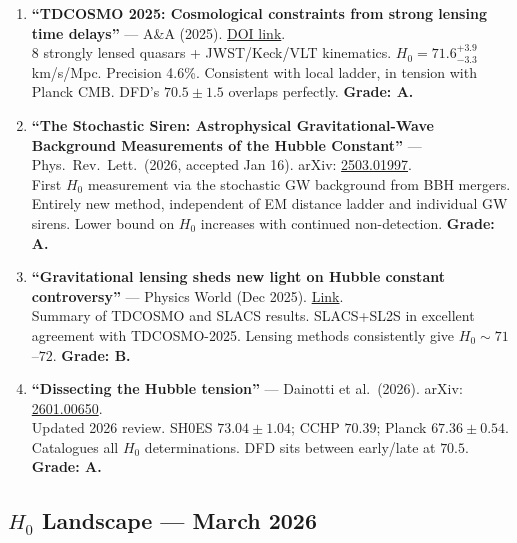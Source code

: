 \documentclass[11pt,a4paper]{article}
\begin{document}
\begin{enumerate}
\item \textbf{``TDCOSMO 2025: Cosmological constraints from strong lensing time delays''} --- A\&A (2025). \href{https://www.aanda.org/articles/aa/full_html/2025/12/aa55801-25/aa55801-25.html}{DOI link}.\\
8 strongly lensed quasars + JWST/Keck/VLT kinematics. $H_0 = 71.6^{+3.9}_{-3.3}$ km/s/Mpc. Precision 4.6\%. Consistent with local ladder, in tension with Planck CMB. DFD's $70.5 \pm 1.5$ overlaps perfectly. \textbf{Grade: A.}

\item \textbf{``The Stochastic Siren: Astrophysical Gravitational-Wave Background Measurements of the Hubble Constant''} --- Phys.\ Rev.\ Lett.\ (2026, accepted Jan 16). arXiv: \href{https://arxiv.org/abs/2503.01997}{2503.01997}.\\
First $H_0$ measurement via the stochastic GW background from BBH mergers. Entirely new method, independent of EM distance ladder and individual GW sirens. Lower bound on $H_0$ increases with continued non-detection. \textbf{Grade: A.}

\item \textbf{``Gravitational lensing sheds new light on Hubble constant controversy''} --- Physics World (Dec 2025). \href{https://physicsworld.com/a/gravitational-lensing-sheds-new-light-on-hubble-constant-controversy/}{Link}.\\
Summary of TDCOSMO and SLACS results. SLACS+SL2S in excellent agreement with TDCOSMO-2025. Lensing methods consistently give $H_0 \sim 71$--$72$. \textbf{Grade: B.}

\item \textbf{``Dissecting the Hubble tension''} --- Dainotti et al.\ (2026). arXiv: \href{https://arxiv.org/abs/2601.00650}{2601.00650}.\\
Updated 2026 review. SH0ES $73.04 \pm 1.04$; CCHP $70.39$; Planck $67.36 \pm 0.54$. Catalogues all $H_0$ determinations. DFD sits between early/late at $70.5$. \textbf{Grade: A.}
\end{enumerate}

\subsection{$H_0$ Landscape --- March 2026}
\end{document}
